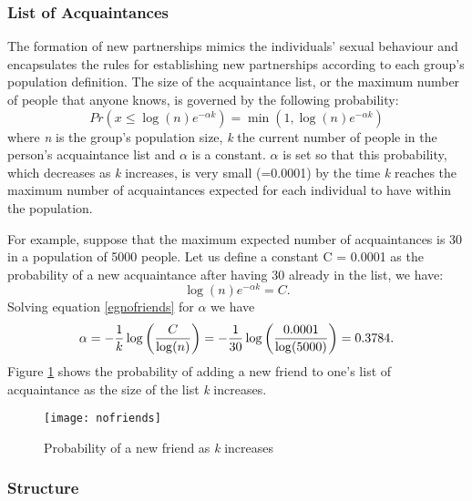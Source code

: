 \subsubsection{List of Acquaintances}\label{listsize}

The formation of new partnerships mimics the individuals' sexual behaviour and
encapsulates the rules for establishing new partnerships according to each group's
population definition. The size of the acquaintance list, or the maximum number of people
that anyone knows, is governed by the following probability:
\begin{equation}\label{nofriends}
    Pr(x \leq \log (n)e^{-\alpha k})=\min(1,\log(n)e^{-\alpha k})
\end{equation}
where \emph{n} is the group's population size, \emph{k} the current number of people in
the person's acquaintance list and $\alpha$ is a constant. $\alpha$ is set so that this
probability, which decreases as \emph{k} increases, is very small (=0.0001) by the time
\emph{k} reaches the maximum number of acquaintances expected for each individual to have
within the population.

For example, suppose that the maximum expected number of acquaintances is 30 in a
population of 5000 people. Let us define a constant C = 0.0001 as the probability of a
new acquaintance after having 30 already in the list, we have:
\begin{equation}\label{egnofriends}
    \log (n)e^{-\alpha k}= C.
\end{equation}
Solving equation \ref{egnofriends} for $\alpha$ we have
\begin{equation}\label{solvealpha}
 \alpha = -\frac{1}{k}\log\left(\frac{C}{\log(n)}\right) =
          -\frac{1}{30}\log\left(\frac{0.0001}{\log(5000)}\right) = 0.3784\rm{.}
\end{equation}
Figure \ref{fignofriends} shows the probability of adding a new friend to one's list of
acquaintance as the size of the list \emph{k} increases.
\begin{figure}[h]
\begin{center}
\texttt{[image: nofriends]}
\caption{Probability of a new friend as \emph{k} increases} \label{fignofriends}
\end{center}
\end{figure}

\subsubsection{Structure}\label{structure}

